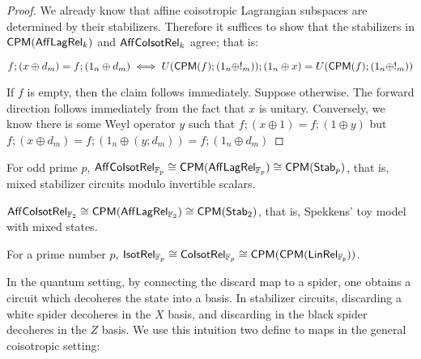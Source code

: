 \begin{proof}


We already know that affine coisotropic Lagrangian subspaces are determined by their stabilizers.
Therefore it suffices to show that the stabilizers in $\mathsf{CPM}(\mathsf{Aff}\mathsf{Lag}\mathsf{Rel}_k)$ and  $\mathsf{Aff}{\sf Co}{\sf Isot}\mathsf{Rel}_k$ agree; that is:


$$f;(x \oplus d_m)=f;(1_n \oplus d_m) \iff U(\mathsf{CPM}(f);(1_n \oplus !_m)); (1_n \oplus x) = U(\mathsf{CPM}(f);(1_n \oplus !_m)) $$


If $f$ is empty, then the claim follows immediately.  Suppose otherwise.
The forward direction follows immediately from the fact that $x$ is unitary.
Conversely, we know there is some Weyl operator $y$ such that  
$f;(x\oplus 1) =  f;(1\oplus y)$
but $f;(x \oplus d_m) = f;(1_n \oplus (y;d_m)) = f;(1_n\oplus d_m)$

 
\end{proof}


\begin{corollary}
For odd prime $p$, $\mathsf{Aff}{\sf Co}{\sf Isot}\mathsf{Rel}_{\mathbb{F}_p}\cong \mathsf{CPM}(\mathsf{Aff}\mathsf{Lag}\mathsf{Rel}_{\mathbb{F}_p})\cong \mathsf{CPM}({\sf Stab}_p)$, that is, mixed stabilizer circuits modulo invertible scalars.
\end{corollary}


\begin{corollary}
$\mathsf{Aff}{\sf Co}{\sf Isot}\mathsf{Rel}_{\mathbb{F}_2}\cong \mathsf{CPM}(\mathsf{Aff}\mathsf{Lag}\mathsf{Rel}_{\mathbb{F}_2})\cong \mathsf{CPM}({\sf Stab}_2)$, that is, Spekkens' toy model with mixed states.
\end{corollary}


\begin{corollary}
For a prime number $p$, ${\sf Isot}\mathsf{Rel}_{\mathbb{F}_p}\cong{\sf Co}{\sf Isot}\mathsf{Rel}_{\mathbb{F}_p}\cong \mathsf{CPM}(\mathsf{CPM}(\sf LinRel_{\mathbb{F}_p}))$.
\end{corollary}


In the quantum setting, by connecting the discard map to a spider, one obtains a circuit which decoheres the state into a basis.  In stabilizer circuits, discarding a white spider decoheres in the $X$ basis, and discarding in the black spider decoheres in the $Z$ basis.  We use this intuition two define to maps in the general coisotropic setting:

